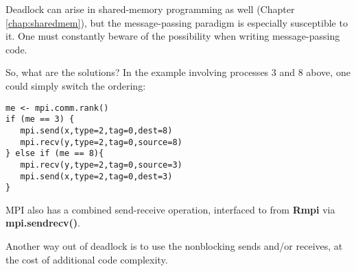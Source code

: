 Deadlock can arise in shared-memory programming as well (Chapter
\ref{chap:sharedmem}), but the message-passing paradigm is especially
susceptible to it.  One must constantly beware of the possibility when
writing message-passing code.

So, what are the solutions?  In the example involving processes 3 and 8
above, one could simply switch the ordering:

\begin{lstlisting}
me <- mpi.comm.rank()
if (me == 3) {
   mpi.send(x,type=2,tag=0,dest=8)
   mpi.recv(y,type=2,tag=0,source=8)
} else if (me == 8){
   mpi.recv(y,type=2,tag=0,source=3)
   mpi.send(x,type=2,tag=0,dest=3)
}
\end{lstlisting}

MPI also has a combined send-receive operation, interfaced to from {\bf
Rmpi} via {\bf mpi.sendrecv()}.

Another way out of deadlock is to use the nonblocking sends and/or
receives, at the cost of additional code complexity.

